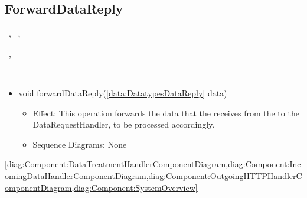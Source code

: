  \subsection{ForwardDataReply}\label{int:InterfacesForwardDataReply}
    \begin{description}
      \item[Provided by:] \iconcomponent{}~, \iconcomponent{}~, \iconcomponent{}~
      \item[Required by:] \iconcomponent{}~, \iconcomponent{}~ 
      \item[Operations:] ~
    \begin{itemize}[noitemsep,nolistsep,leftmargin=-.25cm]
      \item \textsf{void forwardDataReply(\ref{data:DatatypesDataReply} data)}
        \begin{itemize}[noitemsep,nolistsep]
           \item Effect: This operation forwards the data that the  receives from the  to the DataRequestHandler, to be processed accordingly. 
           \item Sequence Diagrams: None
        \end{itemize}
    \end{itemize}
      \item[Diagrams:] \cref{diag:Component:DataTreatmentHandlerComponentDiagram,diag:Component:IncomingDataHandlerComponentDiagram,diag:Component:OutgoingHTTPHandlerComponentDiagram,diag:Component:SystemOverview}
    \end{description}

